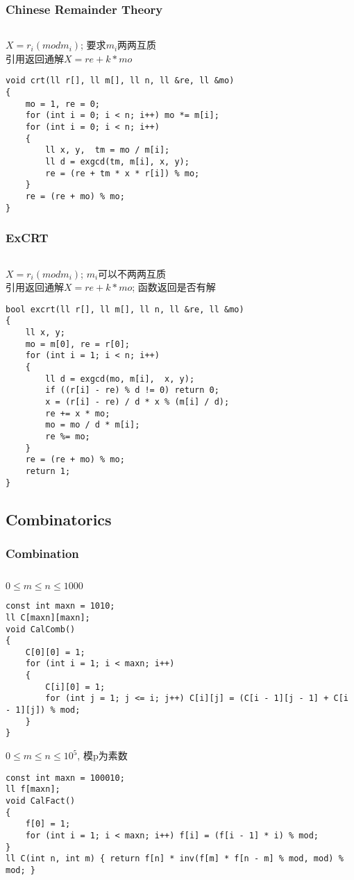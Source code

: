 \documentclass[twoside]{article}
\begin{document}
\subsubsection{Chinese Remainder Theory}
\begin{lstlisting}
\end{lstlisting}
$X = r_i (mod m_i)$; 要求$m_i$两两互质\\
引用返回通解$X = re + k * mo$
\begin{lstlisting}
void crt(ll r[], ll m[], ll n, ll &re, ll &mo)
{
    mo = 1, re = 0;
    for (int i = 0; i < n; i++) mo *= m[i];
    for (int i = 0; i < n; i++)
    {
        ll x, y,  tm = mo / m[i];
        ll d = exgcd(tm, m[i], x, y);
        re = (re + tm * x * r[i]) % mo;
    }
    re = (re + mo) % mo;
}
\end{lstlisting}
\subsubsection{ExCRT}
\begin{lstlisting}
\end{lstlisting}
$X = r_i (mod m_i)$; $m_i$可以不两两互质\\
引用返回通解$X = re + k * mo$; 函数返回是否有解
\begin{lstlisting}
bool excrt(ll r[], ll m[], ll n, ll &re, ll &mo)
{
    ll x, y;
    mo = m[0], re = r[0];
    for (int i = 1; i < n; i++)
    {
        ll d = exgcd(mo, m[i],  x, y);
        if ((r[i] - re) % d != 0) return 0;
        x = (r[i] - re) / d * x % (m[i] / d);
        re += x * mo;
        mo = mo / d * m[i];
        re %= mo;
    }
    re = (re + mo) % mo;
    return 1;
}
\end{lstlisting}
\subsection{Combinatorics}
\subsubsection{Combination}
\begin{lstlisting}
\end{lstlisting}
$0 \leq m \leq n \leq 1000$
\begin{lstlisting}
const int maxn = 1010;
ll C[maxn][maxn];
void CalComb()
{
    C[0][0] = 1;
    for (int i = 1; i < maxn; i++)
    {
        C[i][0] = 1;
        for (int j = 1; j <= i; j++) C[i][j] = (C[i - 1][j - 1] + C[i - 1][j]) % mod;
    }
}

\end{lstlisting}
$0 \leq m \leq n \leq 10^5$, 模p为素数
\begin{lstlisting}
const int maxn = 100010;
ll f[maxn];
void CalFact()
{
    f[0] = 1;
    for (int i = 1; i < maxn; i++) f[i] = (f[i - 1] * i) % mod;
}
ll C(int n, int m) { return f[n] * inv(f[m] * f[n - m] % mod, mod) % mod; }
\end{lstlisting}
\end{document}

